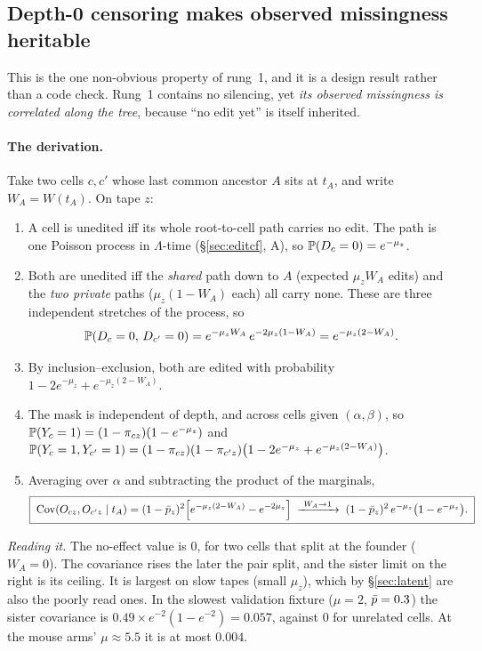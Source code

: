 \subsection{Depth-0 censoring makes observed missingness heritable}\label{sec:censor}

This is the one non-obvious property of rung~1, and it is a design result rather than a code check.
Rung~1 contains no silencing, yet \emph{its observed missingness is correlated along the tree},
because ``no edit yet'' is itself inherited.

\paragraph{The derivation.} Take two cells $c,c'$ whose last common ancestor $A$ sits at $t_A$, and
write $W_A=W(t_A)$. On tape $z$:
\begin{enumerate}
  \item A cell is unedited iff its whole root-to-cell path carries no edit. The path is one Poisson
        process in $\Lambda$-time (\S\ref{sec:editcf}, A), so $\mathbb{P}(D_c=0)=e^{-\mu_z}$.
  \item Both are unedited iff the \emph{shared} path down to $A$ (expected $\mu_zW_A$ edits) and the
        \emph{two private} paths ($\mu_z(1-W_A)$ each) all carry none. These are three independent
        stretches of the process, so
        \begin{equation}
          \mathbb{P}(D_c=0,\,D_{c'}=0)=e^{-\mu_zW_A}\,e^{-2\mu_z(1-W_A)}=e^{-\mu_z(2-W_A)} .
          \label{eq:bothunedited}
        \end{equation}
  \item By inclusion--exclusion, both are edited with probability
        $1-2e^{-\mu_z}+e^{-\mu_z(2-W_A)}$.
  \item The mask is independent of depth, and across cells given $(\alpha,\beta)$, so
        $\mathbb{P}(Y_c=1)=(1-\pi_{cz})(1-e^{-\mu_z})$ and
        $\mathbb{P}(Y_c=1,Y_{c'}=1)=(1-\pi_{cz})(1-\pi_{c'z})\big(1-2e^{-\mu_z}+e^{-\mu_z(2-W_A)}\big)$.
  \item Averaging over $\alpha$ and subtracting the product of the marginals,
        \begin{equation}
          \boxed{\;
          \mathrm{Cov}(O_{cz},O_{c'z}\mid t_A)=(1-\pbar_z)^2\Big[e^{-\mu_z(2-W_A)}-e^{-2\mu_z}\Big]
          \;\xrightarrow{\ W_A\to1\ }\;(1-\pbar_z)^2\,e^{-\mu_z}\big(1-e^{-\mu_z}\big). \;}
          \label{eq:censorcov}
        \end{equation}
\end{enumerate}
\emph{Reading it.} The no-effect value is $0$, for two cells that split at the founder ($W_A=0$).
The covariance rises the later the pair split, and the sister limit on the right is its ceiling. It
is largest on slow tapes (small $\mu_z$), which by \S\ref{sec:latent} are also the poorly read ones.
In the slowest validation fixture ($\mu=2$, $\bar p=0.3$) the sister covariance is
$0.49\times e^{-2}(1-e^{-2})=0.057$, against $0$ for unrelated cells. At the mouse arms' $\mu\approx5.5$
it is at most $0.004$.

